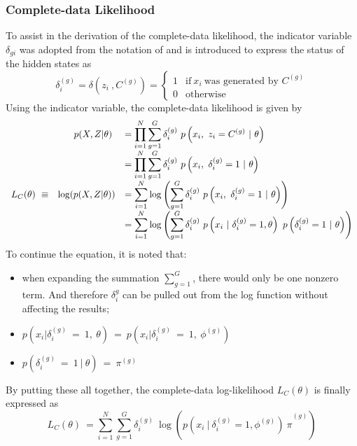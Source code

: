 \subsubsection{Complete-data Likelihood}
\label{sec:completedataLL}
To assist in the derivation of the complete-data likelihood, the indicator variable \(\delta_{gi}\) was adopted from the notation of  and is introduced to express the status of the hidden states as
\begin{equation*}
    \delta ^{( g)}_{i} =\delta \left( z_{i} \ ,C^{( g)}\right) =\begin{cases}
    1 & \text{if} \ x_{i} \ \text{was generated by } C^{( g)}\\
    0 & \text{otherwise}
    \end{cases}
\end{equation*}
Using the indicator variable, the complete-data likelihood is given by
\begin{equation*}
    \begin{array}{ r r l }
     & p( X,Z|\theta ) \  & {\displaystyle =\prod ^{N}_{i=1}\sum ^{G}_{g=1} \delta ^{( g)}_{i} \ p\left( x_{i} ,\ z_{i} =C^{( g)} \ |\ \theta \right)}\\
     &  & {\displaystyle =\prod ^{N}_{i=1}\sum ^{G}_{g=1} \delta ^{( g)}_{i} \ p\left( x_{i} ,\ \delta ^{( g)}_{i} =1\ |\ \theta \right)}\\
    L_{C}( \theta ) \ \equiv  & \log( p( X,Z|\theta )) & {\displaystyle =\sum ^{N}_{i=1}\log\left(\sum ^{G}_{g=1} \delta ^{( g)}_{i} \ p\left( x_{i} ,\ \delta ^{( g)}_{i} =1\ |\ \theta \right)\right)}\\
     &  & {\displaystyle =\sum ^{N}_{i=1}\log\left(\sum ^{G}_{g=1} \delta ^{( g)}_{i} \ p\left( x_{i} \ |\ \delta ^{( g)}_{i} =1,\theta \right) \ p\left( \delta ^{( g)}_{i} =1\ |\ \theta \right)\right)}
    \end{array}
\end{equation*}
To continue the equation, it is noted that:
\begin{itemize}
    \item when expanding the summation \(\sum_{g=1}^{G}\), there would only be one nonzero term. And therefore \(\delta^{g}_i\) can be pulled out from the log function without affecting the results;
    \item $\displaystyle p\left( x_{i} |\delta ^{( g)}_{i} \ =\ 1,\ \theta \right) \ =\ p\left( x_{i} |\delta ^{( g)}_{i} \ =\ 1,\ \phi ^{( g)}\right)$
    \item $\displaystyle p\left( \delta ^{( g)}_{i} \ =\ 1\ |\ \theta \right) \ =\ \pi ^{( g)}$
\end{itemize}
By putting these all together, the complete-data log-likelihood $L_{C}( \theta )$ is finally expressed as
\begin{equation}
    L_{C}( \theta ) \ =\sum ^{N}_{i=1}\sum ^{G}_{g=1}{\displaystyle \delta ^{( g)}_{i} \ }\log\left({\displaystyle p\left( x_{i} \ |\ \delta ^{( g)}_{i} =1,\phi ^{( g)}\right) \ \pi }^{( g)}\right)
    \label{eq:completedataLL}
\end{equation}

